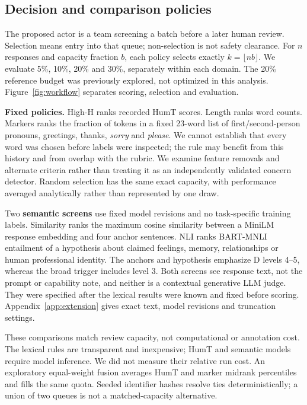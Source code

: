 \subsection{Decision and comparison policies}
The proposed actor is a team screening a batch before a later human review. Selection means entry into that queue; non-selection is not safety clearance. For $n$ responses and capacity fraction $b$, each policy selects exactly $k=\lfloor nb\rfloor$. We evaluate 5\%, 10\%, 20\% and 30\%, separately within each domain. The 20\% reference budget was previously explored, not optimized in this analysis. Figure~\ref{fig:workflow} separates scoring, selection and evaluation.

\textbf{Fixed policies.} High-H ranks recorded HumT scores. Length ranks word counts. Markers ranks the fraction of tokens in a fixed 23-word list of first/second-person pronouns, greetings, thanks, \emph{sorry} and \emph{please}. We cannot establish that every word was chosen before labels were inspected; the rule may benefit from this history and from overlap with the rubric. We examine feature removals and alternate criteria rather than treating it as an independently validated concern detector. Random selection has the same exact capacity, with performance averaged analytically rather than represented by one draw.

Two \textbf{semantic screens} use fixed model revisions and no task-specific training labels. Similarity ranks the maximum cosine similarity between a MiniLM response embedding and four anchor sentences. NLI ranks BART-MNLI entailment of a hypothesis about claimed feelings, memory, relationships or human professional identity. The anchors and hypothesis emphasize D levels 4--5, whereas the broad trigger includes level 3. Both screens see response text, not the prompt or capability note, and neither is a contextual generative LLM judge. They were specified after the lexical results were known and fixed before scoring. Appendix~\ref{app:extension} gives exact text, model revisions and truncation settings.

These comparisons match review capacity, not computational or annotation cost. The lexical rules are transparent and inexpensive; HumT and semantic models require model inference. We did not measure their relative run cost. An exploratory equal-weight fusion averages HumT and marker midrank percentiles and fills the same quota. Seeded identifier hashes resolve ties deterministically; a union of two queues is not a matched-capacity alternative.

